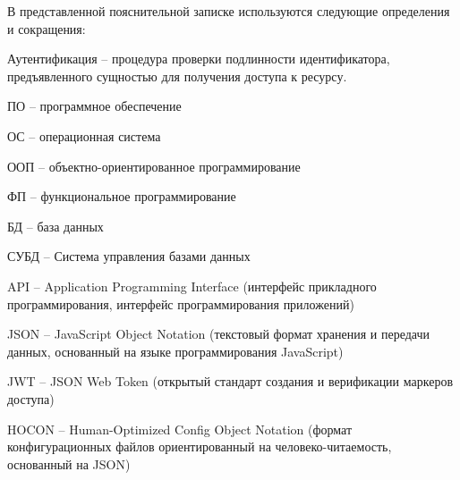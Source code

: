 
В представленной пояснительной записке используются следующие определения и сокращения:

Аутентификация -- процедура проверки подлинности идентификатора, предъявленного сущностью для получения доступа к ресурсу.

ПО -- программное обеспечение

ОС -- операционная система

ООП -- объектно-ориентированное программирование

ФП -- функциональное программирование

БД -- база данных

СУБД -- Система управления базами данных

API -- Application Programming Interface (интерфейс прикладного программирования, интерфейс программирования приложений)

JSON -- JavaScript Object Notation (текстовый формат хранения и передачи данных, основанный на языке программирования JavaScript)

JWT -- JSON Web Token (открытый стандарт создания и верификации маркеров доступа)

HOCON -- Human-Optimized Config Object Notation (формат конфигурационных файлов ориентированный на человеко-читаемость, основанный на JSON)

\clearpage